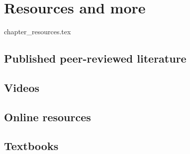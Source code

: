 \chapter{Resources and more}

\begin{flushright} {\tiny {\color{gray} chapter\_resources.tex}} \end{flushright}

\section{Published peer-reviewed literature}



\section{Videos}  %

\section{Online resources}  %

\section{Textbooks}  %
